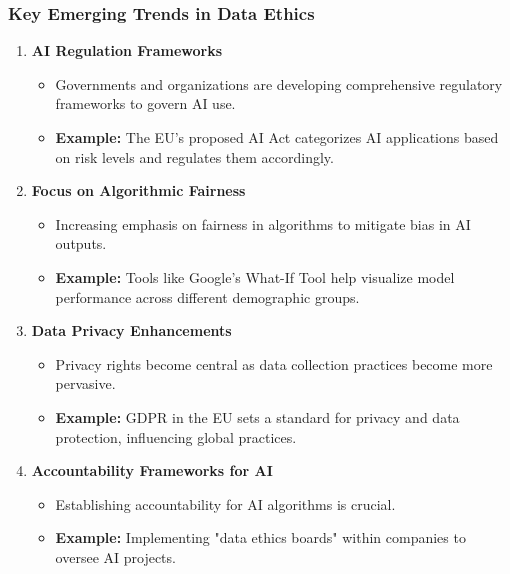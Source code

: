 \documentclass[aspectratio=169]{beamer}
\begin{document}
\begin{frame}[fragile]
    \frametitle{Key Emerging Trends in Data Ethics}
    \begin{enumerate}
        \item \textbf{AI Regulation Frameworks}
            \begin{itemize}
                \item Governments and organizations are developing comprehensive regulatory frameworks to govern AI use.
                \item \textbf{Example:} The EU's proposed AI Act categorizes AI applications based on risk levels and regulates them accordingly.
            \end{itemize}

        \item \textbf{Focus on Algorithmic Fairness}
            \begin{itemize}
                \item Increasing emphasis on fairness in algorithms to mitigate bias in AI outputs.
                \item \textbf{Example:} Tools like Google's What-If Tool help visualize model performance across different demographic groups.
            \end{itemize}
    
        \item \textbf{Data Privacy Enhancements}
            \begin{itemize}
                \item Privacy rights become central as data collection practices become more pervasive.
                \item \textbf{Example:} GDPR in the EU sets a standard for privacy and data protection, influencing global practices.
            \end{itemize}

        \item \textbf{Accountability Frameworks for AI}
            \begin{itemize}
                \item Establishing accountability for AI algorithms is crucial.
                \item \textbf{Example:} Implementing "data ethics boards" within companies to oversee AI projects.
            \end{itemize}
    \end{enumerate}
\end{frame}
\end{document}
